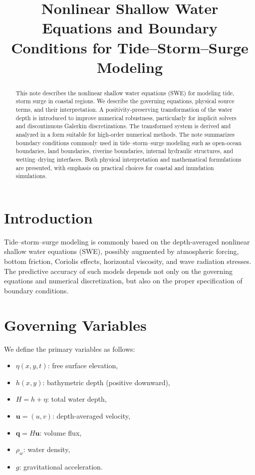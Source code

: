 \documentclass[11pt]{article}
\title{Nonlinear Shallow Water Equations and Boundary Conditions for Tide--Storm--Surge Modeling}
\author{}
\date{}
\begin{document}
\maketitle

\begin{abstract}
This note describes the nonlinear shallow water equations (SWE) for modeling tide, storm surge in coastal regions. We describe the governing equations, physical source terms, and their interpretation. A positivity-preserving transformation of the water depth is introduced to improve numerical robustness, particularly for implicit solvers and discontinuous Galerkin discretizations. The transformed system is derived and analyzed in a form suitable for high-order numerical methods. The note summarizes boundary conditions commonly used in tide--storm--surge modeling such as open-ocean boundaries, land boundaries, riverine boundaries, internal hydraulic structures, and wetting--drying interfaces. Both physical interpretation and mathematical formulations are presented, with emphasis on practical choices for coastal and inundation simulations.
\end{abstract}

\section{Introduction}

Tide--storm--surge modeling is commonly based on the depth-averaged nonlinear shallow water equations (SWE), possibly augmented by atmospheric forcing, bottom friction, Coriolis effects, horizontal viscosity, and wave radiation stresses. The predictive accuracy of such models depends not only on the governing equations and numerical discretization, but also on the proper specification of boundary conditions.


\section{Governing Variables}

We define the primary variables as follows:
\begin{itemize}
    \item $\eta(x,y,t)$: free surface elevation,
    \item $h(x,y)$: bathymetric depth (positive downward),
    \item $H = h + \eta$: total water depth,
    \item $\bm{u} = (u,v)$: depth-averaged velocity,
    \item $\bm{q} = H \bm{u}$: volume flux,
    \item $\rho_w$: water density,
    \item $g$: gravitational acceleration.
\end{itemize}
\end{document}
